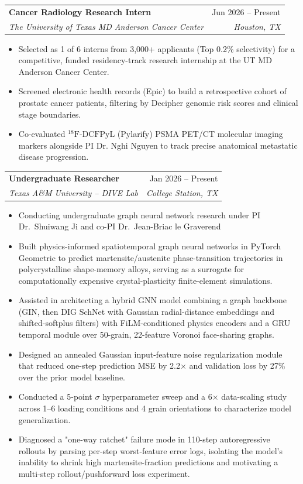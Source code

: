 \documentclass[letterpaper,11pt]{article}
\makeatletter
\newcommand{\resumeItem}[1]{
  \item\small{
    {#1 \vspace{-2pt}}
  }
}
\newcommand{\resumeSubheading}[4]{
  \vspace{-2pt}\item
    \begin{tabular*}{0.97\textwidth}[t]{l@{\extracolsep{\fill}}r}
      \textbf{#1} & #2 \\
      \textit{\small#3} & \textit{\small #4} \\
    \end{tabular*}\vspace{-7pt}
}
\newcommand{\resumeItemListStart}{\begin{itemize}}
\newcommand{\resumeItemListEnd}{\end{itemize}\vspace{-5pt}}
\makeatother
\begin{document}
    \resumeSubheading
      {Cancer Radiology Research Intern}{Jun 2026 -- Present}
      {The University of Texas MD Anderson Cancer Center}{Houston, TX}
      \resumeItemListStart
        \resumeItem{Selected as 1 of 6 interns from 3,000+ applicants (Top 0.2\% selectivity) for a competitive, funded residency-track research internship at the UT MD Anderson Cancer Center.}
        \resumeItem{Screened electronic health records (Epic) to build a retrospective cohort of prostate cancer patients, filtering by Decipher genomic risk scores and clinical stage boundaries.}
        \resumeItem{Co-evaluated $^{18}\text{F-DCFPyL}$ (Pylarify) PSMA PET/CT molecular imaging markers alongside PI Dr. Nghi Nguyen to track precise anatomical metastatic disease progression.}
      \resumeItemListEnd
      
    \resumeSubheading
      {Undergraduate Researcher}{Jan 2026 -- Present}
      {Texas A\&M University -- DIVE Lab}{College Station, TX}
      \resumeItemListStart
        \resumeItem{Conducting undergraduate graph neural network research under PI Dr.\ Shuiwang Ji and co-PI Dr.\ Jean-Briac le Graverend}
        \resumeItem{Built physics-informed spatiotemporal graph neural networks in PyTorch Geometric to predict martensite/austenite phase-transition trajectories in polycrystalline shape-memory alloys, serving as a surrogate for computationally expensive crystal-plasticity finite-element simulations.}
        \resumeItem{Assisted in architecting a hybrid GNN model combining a graph backbone (GIN, then DIG SchNet with Gaussian radial-distance embeddings and shifted-softplus filters) with FiLM-conditioned physics encoders and a GRU temporal module over 50-grain, 22-feature Voronoi face-sharing graphs.}
        \resumeItem{Designed an annealed Gaussian input-feature noise regularization module that reduced one-step prediction MSE by 2.2$\times$ and validation loss by 27\% over the prior model baseline.}
        \resumeItem{Conducted a 5-point $\sigma$ hyperparameter sweep and a 6$\times$ data-scaling study across 1--6 loading conditions and 4 grain orientations to characterize model generalization.}
        \resumeItem{Diagnosed a "one-way ratchet" failure mode in 110-step autoregressive rollouts by parsing per-step worst-feature error logs, isolating the model's inability to shrink high martensite-fraction predictions and motivating a multi-step rollout/pushforward loss experiment.}
      \resumeItemListEnd
\end{document}
